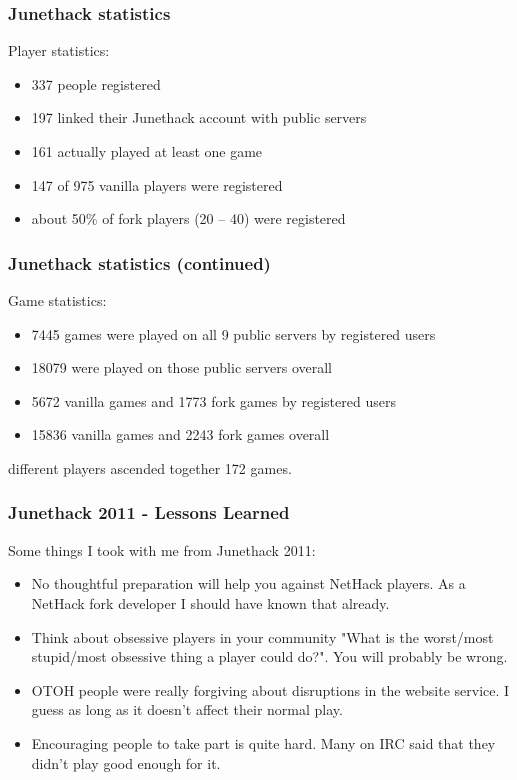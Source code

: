 \documentclass[handout]{beamer}
\begin{document}
\begin{frame}
\frametitle{Junethack statistics}
  Player statistics:\pause
  \begin{itemize}[<+->]
    \item 337 people registered
    \item 197 linked their Junethack account with public servers
    \item 161 actually played at least one game
    \item 147 of 975 vanilla players were registered
    \item about 50\% of fork players (20 -- 40) were registered
  \end{itemize}\pause
\end{frame}

\begin{frame}
\frametitle{Junethack statistics (continued)}
  Game statistics:\pause
  \begin{itemize}[<+->]
    \item 7445 games were played on all 9 public servers by registered users
    \item 18079 were played on those public servers overall
    \item 5672 vanilla games and 1773 fork games by registered users
    \item 15836 vanilla games and 2243 fork games overall
  \end{itemize} different players ascended together 172 games.\pause
\end{frame}

\begin{frame}
\frametitle{Junethack 2011 - Lessons Learned}
  Some things I took with me from Junethack 2011:\pause
  \begin{itemize}[<+->]
    \item No thoughtful preparation will help you against NetHack players.\pause{} As a NetHack fork developer I should have known that already.
    \item Think about obsessive players in your community "What is the worst/most stupid/most obsessive thing a player could do?".\pause{} You will probably be wrong.
    \item OTOH people were really forgiving about disruptions in the website service.\pause{} I guess as long as it doesn't affect their normal play.
    \item Encouraging people to take part is quite hard. Many on IRC said that they didn't play good enough for it.
  \end{itemize}
\end{frame}
\end{document}
